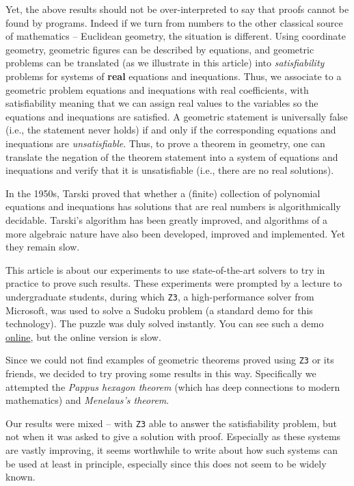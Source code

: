 \documentclass{amsart}
\theoremstyle{plain}
\theoremstyle{definition}
\theoremstyle{remark}
\begin{document}
Yet, the above results should not be over-interpreted to say that proofs
cannot be found by programs. Indeed if we turn from numbers to the other
classical source of mathematics -- Euclidean geometry, the situation is
different. Using coordinate geometry, geometric figures can be described by equations,
and geometric problems can be translated (as we illustrate in this article) into
\emph{satisfiability} problems for systems of \textbf{real} equations and inequations. Thus, we
associate to a geometric problem equations and inequations with real coefficients,
with satisfiability meaning that we can
assign real values to the variables so the equations and inequations are satisfied.
A geometric statement is universally false (i.e., the statement never holds) if and only if the corresponding equations and inequations are \emph{unsatisfiable}. Thus, to prove a theorem in geometry, one can translate the negation of the theorem statement into a system of equations and inequations and verify that it is unsatisfiable (i.e., there are no real solutions).

In the 1950s, Tarski proved that whether a (finite)
collection of polynomial equations and inequations has solutions that
are real numbers is algorithmically decidable.  Tarski's algorithm has been greatly improved,
and algorithms of a more algebraic nature have also been developed,
improved and implemented. Yet they remain slow.

This article is about our experiments to use
state-of-the-art solvers to try in practice to prove such results.
These experiments were prompted by a lecture
to undergraduate students, during which \texttt{Z3}, a high-performance
solver from Microsoft, was used to solve a Sudoku problem (a standard demo for
this technology). The puzzle was duly solved instantly. You can see such
a demo \href{https://rise4fun.com/Z3/Cs7p}{online}, but the online
version is slow.

Since we could not find examples of geometric theorems proved using \texttt{Z3} or
its friends, we decided to try proving
some results in this way. Specifically we attempted the \emph{Pappus hexagon theorem}
(which has deep connections to modern mathematics) and \emph{Menelaus's theorem}.

Our results were mixed -- with \texttt{Z3} able to answer the satisfiability problem,
but not when it was asked to give a solution with proof.
Especially as these systems are vastly improving, it seems worthwhile to
write about how such systems can be used at least in principle,
especially since this does not seem to be widely known.
\end{document}
